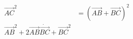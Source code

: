 \documentclass[preview]{standalone}
\begin{document}
\begin{align*}
\overrightarrow{AC}^2 &= (\overrightarrow{AB} + \overrightarrow{BC})^2\\\overrightarrow{AB}^2 + 2\overrightarrow{AB}\dot\overrightarrow{BC} + \overrightarrow{BC}^2
\end{align*}
\end{document}
